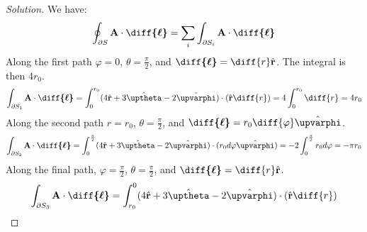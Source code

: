 \documentclass[crop=false,class=book,oneside]{standalone}
\begin{document}
            \begin{proof}[Solution]
                We have:
                \begin{equation*}
                    \oint_{\partial S}
                    \mathbf{A}\cdot\boldsymbol{\diff{\ell}}
                    =\sum_{i}\int_{\partial{S_{i}}}
                    \mathbf{A}\cdot\boldsymbol{\diff{\ell}}
                \end{equation*}
                Along the first path $\varphi=0$,
                $\theta=\frac{\pi}{2}$, and
                $\boldsymbol{\diff{\ell}}%
                 =\diff{r}\hat{\mathbf{r}}$.
                The integral is then $4r_{0}$.
                \begin{equation*}
                    \int_{\partial S_{1}}
                    \mathbf{A}\cdot\boldsymbol{\diff{\ell}}
                    =\int_{0}^{r_{0}}
                    (4\hat{\mathbf{r}}
                    +3\hat{\boldsymbol{\uptheta}}
                    -2\hat{\boldsymbol{\upvarphi}})
                    \cdot(\hat{\mathbf{r}}\diff{r})
                    =4\int_{0}^{r_{0}}\diff{r}
                    =4r_{0}
                \end{equation*}
                Along the second path $r=r_{0}$,
                $\theta=\frac{\pi}{2}$, and 
                $\boldsymbol{\diff{\ell}}%
                 =r_{0}\diff{\varphi}\hat{\boldsymbol{\upvarphi}}$.
                \begin{equation*}
                    \int_{\partial S_{2}}
                    \mathbf{A}\cdot\boldsymbol{\diff{\ell}}
                    =\int_{0}^{\frac{\pi}{2}}(4\hat{\mathbf{r}}
                    +3\hat{\boldsymbol{\uptheta}}
                    -2\hat{\boldsymbol{\upvarphi}})
                    \cdot(r_{0}d\varphi\hat{\boldsymbol{\upvarphi}})
                    =-2\int_{0}^{\frac{\pi}{2}}r_{0}d\varphi
                    =-\pi r_{0}
                \end{equation*}
                Along the final path, $\varphi=\frac{\pi}{2}$,
                $\theta=\frac{\pi}{2}$, and
                $\boldsymbol{\diff{\ell}}%
                 =\diff{r}\hat{\mathbf{r}}$.
                \begin{equation*}
                    \int_{\partial S_{3}}
                    \mathbf{A}\cdot\boldsymbol{\diff{\ell}}
                    =\int_{r_{0}}^{0}
                    (4\hat{\mathbf{r}}
                     +3\hat{\boldsymbol{\uptheta}}
                     -2\hat{\boldsymbol{\upvarphi}})
                    \cdot(\hat{\mathbf{r}}\diff{r})

\end{equation*}
\end{proof}
\end{document}
